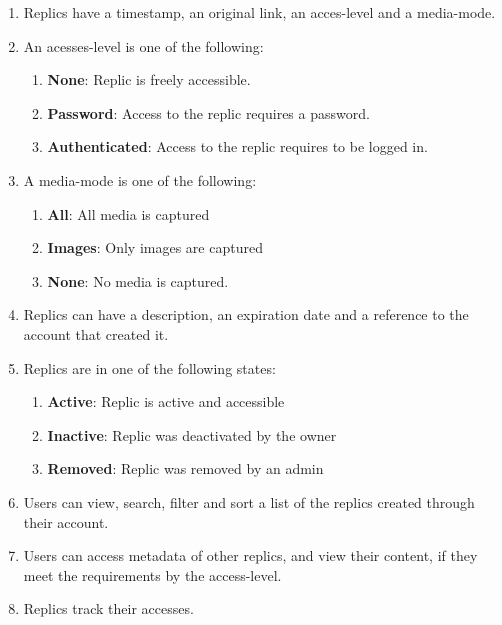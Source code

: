\begin{enumerate}[label=\textit{AC \arabic*}, resume]
    \item \label{ac:replics:1} Replics have a timestamp, an original link, an acces-level and a media-mode.
    \item \label{ac:replics:2} An acesses-level is one of the following: \begin{enumerate}
                                                                             \item \textbf{None}: Replic is freely accessible.
                                                                             \item \textbf{Password}: Access to the replic requires a password.
                                                                             \item \textbf{Authenticated}: Access to the replic requires to be logged in.
    \end{enumerate}
    \item \label{ac:replics:3} A media-mode is one of the following: \begin{enumerate}
                                                                         \item \textbf{All}: All media is captured
                                                                         \item \textbf{Images}: Only images are captured
                                                                         \item \textbf{None}: No media is captured.
    \end{enumerate}
    \item \label{ac:replics:4} Replics can have a description, an expiration date and a reference to the account that created it.
    \item \label{ac:replics:5} Replics are in one of the following states: \begin{enumerate}
                                                                               \item \textbf{Active}: Replic is active and accessible
                                                                               \item \textbf{Inactive}: Replic was deactivated by the owner
                                                                               \item \textbf{Removed}: Replic was removed by an admin
    \end{enumerate}
    \item \label{ac:replics:6} Users can view, search, filter and sort a list of the replics created through their account.
    \item \label{ac:replics:7} Users can access metadata of other replics, and view their content, if they meet the requirements by the access-level.
    \item \label{ac:replics:8} Replics track their accesses.
\end{enumerate}

